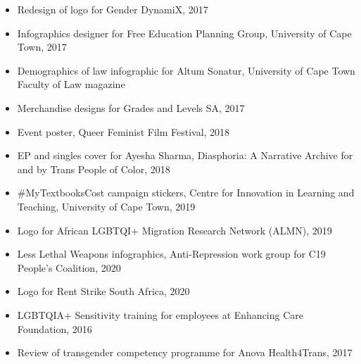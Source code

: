 \documentclass[10pt,a4paper]{altacv}
\begin{document}
\begin{itemize}
\item Redesign of logo for Gender DynamiX, 2017
\item Infographics designer for Free Education Planning Group, University of Cape Town, 2017
\item Demographics of law infographic for Altum Sonatur, University of Cape Town Faculty of Law magazine
\item Merchandise designs for Grades and Levels SA, 2017
\item Event poster, Queer Feminist Film Festival, 2018
\item EP and singles cover for Ayesha Sharma, Diasphoria: A Narrative Archive for and by Trans People of Color, 2018
\item \#MyTextbooksCost campaign stickers, Centre for Innovation in Learning and Teaching, University of Cape Town, 2019
\item Logo for African LGBTQI+ Migration Research Network (ALMN), 2019
\item Less Lethal Weapons infographics, Anti-Repression work group for C19 People's Coalition, 2020
\item Logo for Rent Strike South Africa, 2020
\end{itemize}

\divider

\begin{itemize}
\item LGBTQIA+ Sensitivity training for employees at Enhancing Care Foundation, 2016
\item Review of transgender competency programme for Anova Health4Trans, 2017
\end{itemize}

\divider

\end{document}
